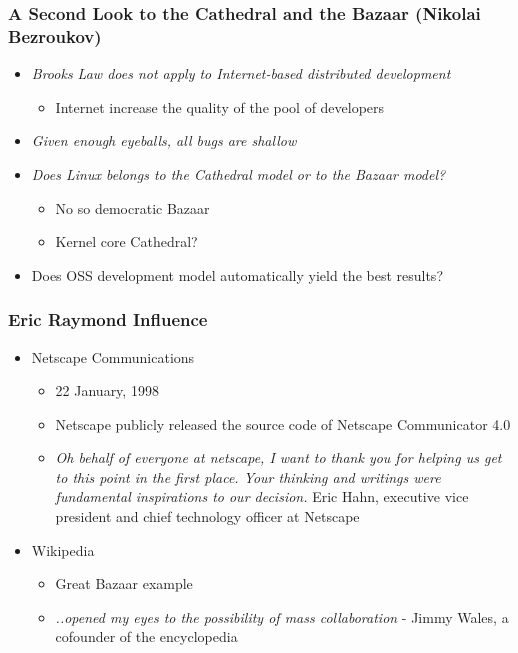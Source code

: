 \documentclass{beamer}
\begin{document}
\begin{frame}
\frametitle{A Second Look to the Cathedral and the Bazaar (Nikolai Bezroukov)}

\begin{itemize}

\item \emph{Brooks Law does not apply to Internet-based distributed development}
	\begin{itemize}
	\item Internet increase the quality of the pool of developers
	\end{itemize}

\item \emph{Given enough eyeballs, all bugs are shallow}
\item \emph{Does Linux belongs to the Cathedral model or to the Bazaar model?}
	\begin{itemize}
		\item No so democratic Bazaar
		\item Kernel core Cathedral?
	\end{itemize}

\item Does OSS development model automatically yield the best results?

\end{itemize}

\end{frame}



\begin{frame}
\frametitle{Eric Raymond Influence}

\begin{itemize}

\item Netscape Communications
	\begin{itemize}
	\item 22 January, 1998
	\item Netscape publicly released the source code of Netscape Communicator 4.0
	\item \emph{Oh behalf of everyone at netscape, I want to thank you for helping us get to this point in the first place. Your thinking and writings were fundamental inspirations to our decision.} Eric Hahn, executive vice president and chief technology officer at Netscape
	\end{itemize}
	
\item Wikipedia
	\begin{itemize}
	\item Great Bazaar example
	\item \emph{..opened my eyes to the possibility of mass collaboration} - Jimmy Wales, a cofounder of the encyclopedia
	\end{itemize}


\end{itemize}

\end{frame}
\end{document}
